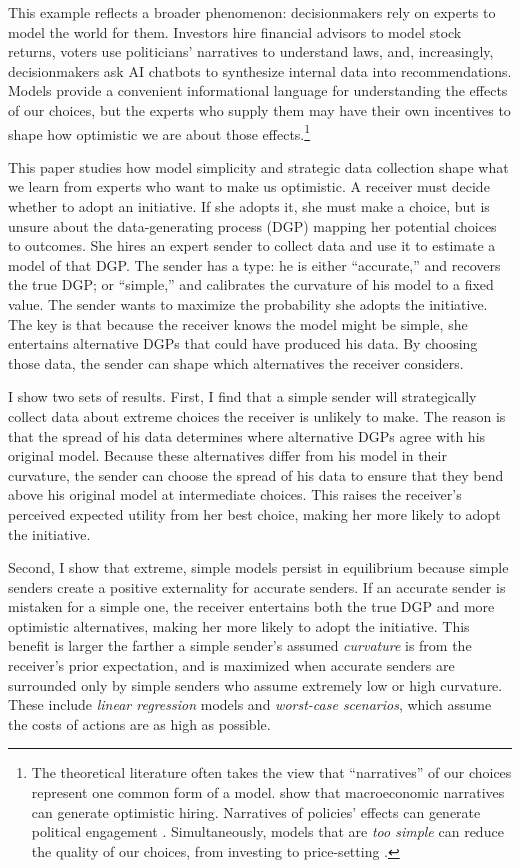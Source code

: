 \documentclass[11pt,dvipsnames]{article}
\begin{document}
This example reflects a broader phenomenon: decisionmakers rely on experts to model the world for them.
Investors hire financial advisors to model stock returns, voters use politicians' narratives to understand laws, and, increasingly, decisionmakers ask AI chatbots to synthesize internal data into recommendations.
Models provide a convenient informational language for understanding the effects of our choices, but the experts who supply them may have their own incentives to shape how optimistic we are about those effects.\footnote{The theoretical literature often takes the view that ``narratives'' of our choices represent one common form of a model. \citet{flynn2025contagious} show that macroeconomic narratives can generate optimistic hiring. Narratives of policies' effects can generate political engagement \citep{levy2022misspecified,eliaz2026news}. Simultaneously, models that are \emph{too simple} can reduce the quality of our choices, from investing to price-setting \citep{10.1257/aer.107.4.967,han2024minds}.}

This paper studies how model simplicity and strategic data collection shape what we learn from experts who want to make us optimistic.
A receiver must decide whether to adopt an initiative.
If she adopts it, she must make a choice, but is unsure about the data-generating process (DGP) mapping her potential choices to outcomes.
She hires an expert sender to collect data and use it to estimate a model of that DGP.
The sender has a type: he is either ``accurate,'' and recovers the true DGP; or ``simple,'' and calibrates the curvature of his model to a fixed value.
The sender wants to maximize the probability  she adopts the initiative.
The key is that because the receiver knows the model might be simple, she entertains alternative DGPs that could have produced his data.
By choosing those data, the sender can shape which alternatives the receiver considers.

I show two sets of results.
First, I find that a simple sender will strategically collect data about extreme choices the receiver is unlikely to make.
The reason is that the spread of his data determines where alternative DGPs agree with his original model.
Because these alternatives differ from his model in their curvature, the sender can choose the spread of his data to ensure that they bend above his original model at intermediate choices.
This raises the receiver's perceived expected utility from her best choice, making her more likely to adopt the initiative.

Second, I show that extreme, simple models persist in equilibrium because simple senders create a positive externality for accurate senders. If an accurate sender is mistaken for a simple one, the receiver entertains both the true DGP and more optimistic alternatives, making her more likely to adopt the initiative.
This benefit is larger the farther a simple sender's assumed \emph{curvature} is from the receiver's prior expectation, and is maximized when accurate senders are surrounded only by simple senders who assume extremely low or high curvature.
These include \emph{linear regression} models and \emph{worst-case scenarios}, which assume the costs of actions are as high as possible.
\end{document}
